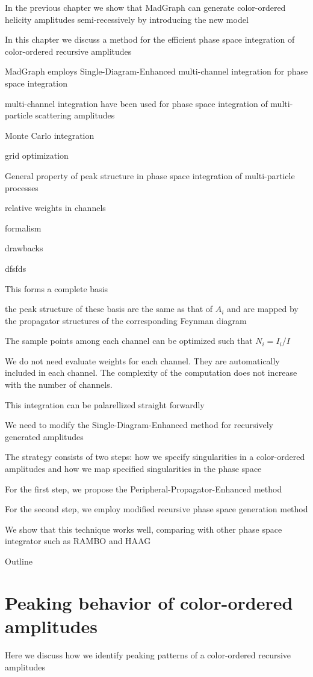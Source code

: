 \documentclass{book}
\begin{document}
In the previous chapter we show that MadGraph can generate color-ordered helicity amplitudes semi-recessively by introducing the new model

In this chapter we discuss a method for the efficient phase space integration of color-ordered recursive amplitudes

MadGraph employs Single-Diagram-Enhanced multi-channel integration for phase space integration

multi-channel integration have been used for phase space integration of multi-particle scattering amplitudes 

Monte Carlo integration



grid optimization

General property of peak structure in phase space integration of multi-particle processes

relative weights in channels

formalism

drawbacks

dfsfds

This forms a complete basis

the peak structure of these basis are the same as that of $A_i$ and are mapped by the propagator structures of the corresponding Feynman diagram

The sample points among each channel can be optimized such that $N_i = I_i / I $

We do not need evaluate weights for each channel. They are automatically included in each channel. The complexity of the computation does not increase with the number of channels.

This integration can be palarellized straight forwardly

We need to modify the Single-Diagram-Enhanced method for recursively generated amplitudes

The strategy consists of two steps: how we specify singularities in a color-ordered amplitudes and how we map specified singularities in the phase space

For the first step, we propose the Peripheral-Propagator-Enhanced method

For the second step, we employ modified recursive phase space generation method

We show that this technique works well, comparing with other phase space integrator such as RAMBO and HAAG

Outline

\section{Peaking behavior of color-ordered amplitudes}
Here we discuss how we identify peaking patterns of a color-ordered recursive amplitudes 
\end{document}
